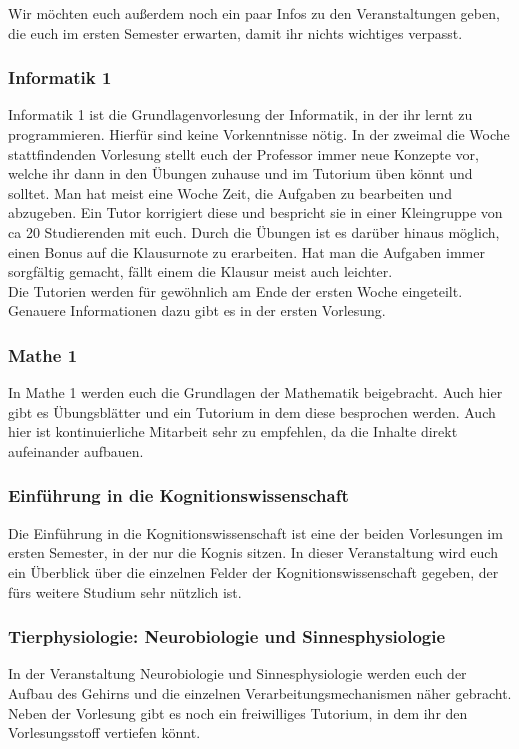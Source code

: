 Wir möchten euch außerdem noch ein paar Infos zu den Veranstaltungen geben, die euch im ersten Semester erwarten, damit ihr nichts wichtiges verpasst.

\subsubsection*{Informatik 1}
Informatik 1 ist die Grundlagenvorlesung der Informatik, in der ihr lernt zu programmieren. Hierfür sind keine Vorkenntnisse nötig. In der zweimal die Woche stattfindenden Vorlesung stellt euch der Professor immer neue Konzepte vor, welche ihr dann in den Übungen zuhause und im Tutorium üben könnt und solltet. Man hat meist eine Woche Zeit, die Aufgaben zu bearbeiten und abzugeben. Ein Tutor korrigiert diese und bespricht sie in einer Kleingruppe von ca 20 Studierenden mit euch. Durch die Übungen ist es darüber hinaus möglich, einen Bonus auf die Klausurnote zu erarbeiten. Hat man die Aufgaben immer sorgfältig gemacht, fällt einem die Klausur meist auch leichter.\\
Die Tutorien werden für gewöhnlich am Ende der ersten Woche eingeteilt. Genauere Informationen dazu gibt es in der ersten Vorlesung.

\subsubsection*{Mathe 1}
In Mathe 1 werden euch die Grundlagen der Mathematik beigebracht. Auch hier gibt es Übungsblätter und ein Tutorium in dem diese besprochen werden. Auch hier ist kontinuierliche Mitarbeit sehr zu empfehlen, da die Inhalte direkt aufeinander aufbauen.

\subsubsection*{Einführung in die Kognitionswissenschaft}
Die Einführung in die Kognitionswissenschaft ist eine der beiden Vorlesungen im ersten Semester, in der nur die Kognis sitzen. In dieser Veranstaltung wird euch ein Überblick über die einzelnen Felder der Kognitionswissenschaft gegeben, der fürs weitere Studium sehr nützlich ist.

\subsubsection*{Tierphysiologie: Neurobiologie und Sinnesphysiologie}
In der Veranstaltung Neurobiologie und Sinnesphysiologie werden euch der Aufbau des Gehirns und die einzelnen Verarbeitungsmechanismen näher gebracht. Neben der Vorlesung gibt es noch ein freiwilliges Tutorium, in dem ihr den Vorlesungsstoff vertiefen könnt.

